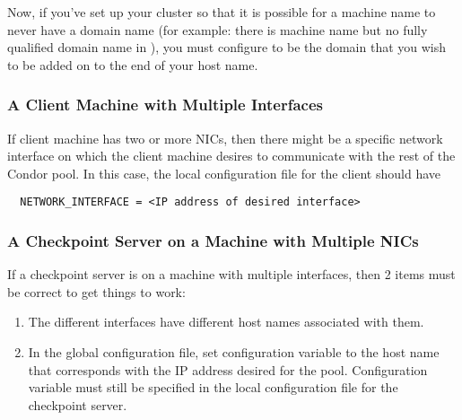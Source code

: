Now, if you've set up your cluster so that it is possible for a machine
name to never have a domain name (for example: there is machine
name but no fully qualified domain name in ), you must
configure  to be the domain that you wish
to be added on to the end of your host name.


\subsubsection{A Client Machine with Multiple Interfaces}

If client machine has two or more NICs, then there might be
a specific network interface on which the client machine desires to
communicate with the rest of the Condor pool. 
In this case, the local configuration file for the client should have
\begin{verbatim}
  NETWORK_INTERFACE = <IP address of desired interface>
\end{verbatim}

\subsubsection{A Checkpoint Server on a Machine with Multiple NICs}

If a checkpoint server is on a machine with multiple interfaces,
then 2 items must be correct to get things to work:
\begin{enumerate}
\item
The different interfaces have different host names associated with them.
\item
In the global configuration file,
set configuration variable  to the host name
that corresponds with the IP address desired for the pool.
Configuration variable  must still be specified
in the local configuration file for the checkpoint server.
\end{enumerate}

